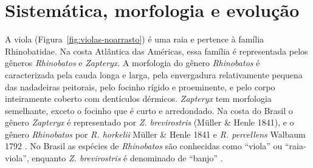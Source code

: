 \documentclass[a4paper,11pt,twoside,showtrims,onecolumn,openright,final]{memoir}
\begin{document}


\newpage

\section*{Sistemática,  morfologia e evolução}

A viola (Figura~\ref{fig:violas-noarrasto}) é uma raia e pertence à família Rhinobatidae.
Na costa Atlântica das Américas, essa família é representada pelos 
gêneros \emph{Rhinobatos} e \emph{Zapteryx}. A morfologia do gênero \emph{Rhinobatos} é caracterizada 
pela cauda longa e  larga, pela envergadura relativamente pequena das nadadeiras 
peitorais, pelo focinho rígido e proeminente,  e pelo corpo inteiramente coberto 
com dentículos dérmicos. \emph{Zapteryx} tem morfologia semelhante, exceto o focinho que 
é curto e arredondado. Na costa do Brasil o gênero \emph{Zapteryx} é representado por  
\emph{Z. brevirostris} (Müller \& Henle 1841), e o gênero \emph{Rhinobatos} por 
\emph{R. horkelii} Müller \& Henle 1841 e \emph{R. percellens} Walbaum 1792 \citep{menni2000}. %
No Brasil as espécies de \emph{Rhinobatos} são conhecidas como ``viola'' ou ``raia-viola'', 
enquanto \emph{Z. brevirostris} é denominado de ``banjo'' \citep{FIGUEIREDO1977}. %

%
%
\end{document}
